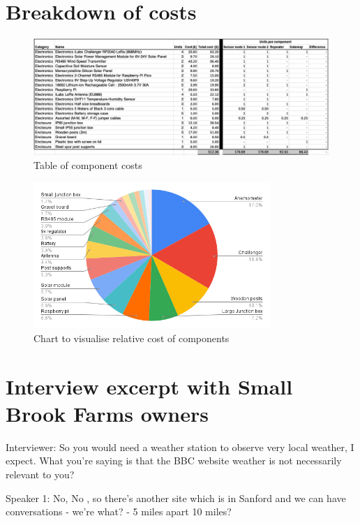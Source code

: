 \section{Breakdown of costs}\label{app:cost-nodes}

\begin{figure}[H]
    \centering
    \includegraphics[width=1\textwidth]{contents/appendix/fig5/table.jpg}
    \caption{Table of component costs}
    \label{fig:cost-table}
\end{figure}

\begin{figure}[H]
    \centering
    \includegraphics[width=0.8\textwidth]{contents/appendix/fig5/chart.png}
    \caption{Chart to visualise relative cost of components}
    \label{fig:cost-chart}
\end{figure}

\section{Interview excerpt with Small Brook Farms
owners}\label{sec:small-brook-interview}

Interviewer: So you would need a weather station to observe very local weather,
I expect. What you're saying is that the BBC website weather is not necessarily
relevant to you?

Speaker 1: No, No , so there's another site which is in Sanford and we can have
conversations - we're what? - 5 miles apart 10 miles? 


